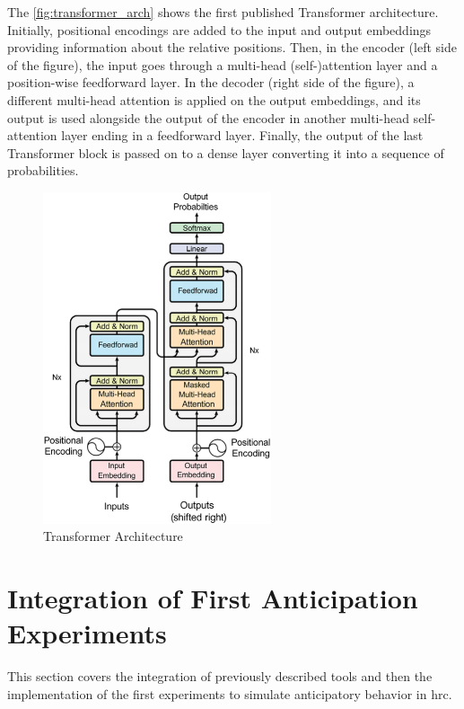 The \autoref{fig:transformer_arch} shows the first published Transformer architecture. Initially, positional encodings are added to the input and output embeddings providing information about the relative positions. Then, in the encoder (left side of the figure), the input goes through a multi-head (self-)attention layer and a position-wise feedforward layer. In the decoder (right side of the figure), a different multi-head attention is applied on the output embeddings, and its output is used alongside the output of the encoder in another multi-head self-attention layer ending in a feedforward layer. Finally, the output of the last Transformer block is passed on to a dense layer converting it into a sequence of probabilities.

\begin{figure}[ht]
    \centerline{\includegraphics[width=0.6\textwidth]{figs/transformer.pdf}}
    \caption[Transformer Architecture]{Transformer Architecture \cite{Vaswani2017}}
    \label{fig:transformer_arch}
\end{figure}

\section{Integration of First Anticipation Experiments}
\label{section:first_experiments}

This section covers the integration of previously described tools and then the implementation of the first experiments to simulate anticipatory behavior in \acs{hrc}.

